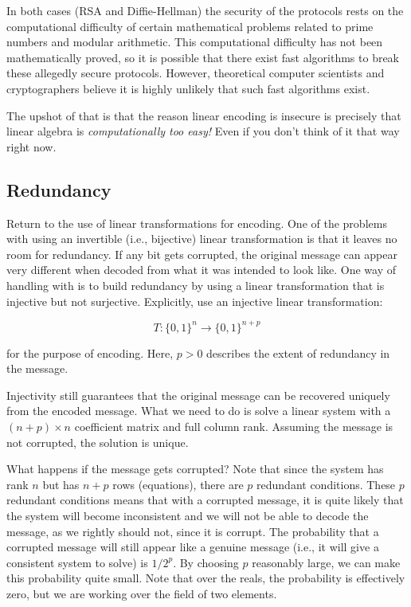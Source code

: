 \documentclass[10pt]{amsart}
\begin{document}
In both cases (RSA and Diffie-Hellman) the security of the protocols
rests on the computational difficulty of certain mathematical problems
related to prime numbers and modular arithmetic. This computational
difficulty has not been mathematically proved, so it is possible that
there exist fast algorithms to break these allegedly secure
protocols. However, theoretical computer scientists and cryptographers
believe it is highly unlikely that such fast algorithms exist.

The upshot of that is that the reason linear encoding is insecure is
precisely that linear algebra is {\em computationally too easy!} Even
if you don't think of it that way right now.
\subsection{Redundancy}

Return to the use of linear transformations for encoding. One of the
problems with using an invertible (i.e., bijective) linear
transformation is that it leaves no room for redundancy. If any bit
gets corrupted, the original message can appear very different when
decoded from what it was intended to look like. One way of handling
with is to build redundancy by using a linear transformation that is
injective but not surjective. Explicitly, use an injective linear
transformation:

$$T:\{ 0,1 \}^n \to \{ 0,1 \}^{n + p}$$

for the purpose of encoding. Here, $p > 0$ describes the extent of
redundancy in the message.

Injectivity still guarantees that the original message can be
recovered uniquely from the encoded message. What we need to do is
solve a linear system with a $(n + p) \times n$ coefficient matrix and
full column rank. Assuming the message is not corrupted, the solution
is unique.

What happens if the message gets corrupted? Note that since the system
has rank $n$ but has $n + p$ rows (equations), there are $p$ redundant
conditions. These $p$ redundant conditions means that with a corrupted
message, it is quite likely that the system will become inconsistent
and we will not be able to decode the message, as we rightly should
not, since it is corrupt. The probability that a corrupted message
will still appear like a genuine message (i.e., it will give a
consistent system to solve) is $1/2^p$. By choosing $p$ reasonably
large, we can make this probability quite small. Note that over the
reals, the probability is effectively zero, but we are working over
the field of two elements.
\end{document}
